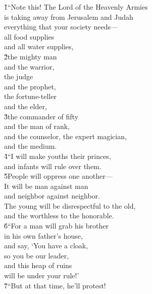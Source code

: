 \begin{poetry}
\poeml {}
\v{1}``Note this! The Lord  of the Heavenly Armies \\
\poemll    is taking away from Jerusalem and Judah \\
\poemlll       everything that your society needs--- \\
\poeml all food supplies \\
\poemll    and all water supplies, \\
\poeml \v{2}the mighty man \\
\poemll    and the warrior, \\
\poeml the judge \\
\poemll    and the prophet, \\
\poeml the fortune-teller \\
\poemll    and the elder, \\
\poeml \v{3}the commander of fifty \\
\poemll    and the man of rank, \\
\poeml and the counselor, the expert magician, \\
\poemll    and the medium. \\
\poeml \v{4}``I will make youths their princes, \\
\poemll    and infants will rule over them. \\
\poeml \v{5}People will oppress one another--- \\
\poemll    It will be man against man \\
\poemlll       and neighbor against neighbor. \\
\poeml The young will be disrespectful to the old, \\
\poemll    and the worthless to the honorable. \\
\poeml \v{6}``For a man will grab his brother \\
\poemll    in his own father's house, \\
\poeml and say, `You have a cloak, \\
\poemll    so you be our leader, \\
\poeml and this heap of ruins \\
\poemll    will be under your rule!' \\
\poeml \v{7}``But at that time, he'll protest! \\

\end{poetry}
